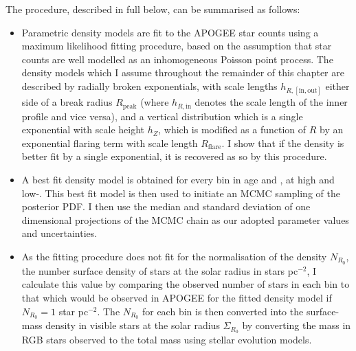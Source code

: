 The procedure, described in full below, can be summarised as follows:
  \begin{itemize}
  \item Parametric density models are fit to the APOGEE star counts using a maximum likelihood fitting procedure, based on the assumption that star counts are well modelled as an inhomogeneous Poisson point process. The density models which I assume throughout the remainder of this chapter are described by radially broken exponentials, with scale lengths $h_{R,\mathrm{[in,out]}}$ either side of a break radius $R_{\mathrm{peak}}$ (where $h_{R,\mathrm{in}}$ denotes the scale length of the inner profile and vice versa), and a vertical distribution which is a single exponential with scale height $h_Z$, which is modified as a function of $R$ by an exponential flaring term with scale length $R_{\mathrm{flare}}$. I show that if the density is better fit by a single exponential, it is recovered as so by this procedure.
 \item A best fit density model is obtained for every bin in age and \feh{}, at high and low-\afe{}. This best fit model is then used to initiate an MCMC sampling of the posterior PDF. I then use the median and standard deviation of one dimensional projections of the MCMC chain as our adopted parameter values and uncertainties.
  \item As the fitting procedure does not fit for the normalisation of the density $N_{R_0}$, the number surface density of stars at the solar radius in stars pc$^{-2}$, I calculate this value by comparing the observed number of stars in each bin to that which would be observed in APOGEE for the fitted density model if $N_{R_0} = 1 $ star pc$^{-2}$. The $N_{R_0}$ for each bin is then converted into the surface-mass density in visible stars at the solar radius $\Sigma_{R_0}$ by converting the mass in RGB stars observed to the total mass using stellar evolution models.
 \end{itemize}

 

